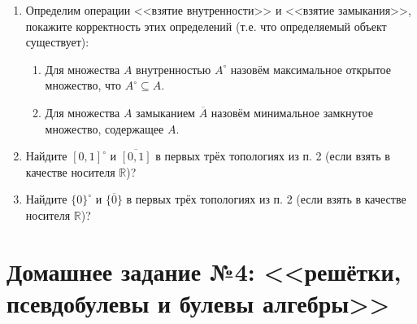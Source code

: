 \documentclass[10pt,a4paper,oneside]{article}
\begin{document}
\begin{enumerate}
\item Определим операции <<взятие внутренности>> и <<взятие замыкания>>, покажите корректность этих определений
(т.е. что определяемый объект существует):
\begin{enumerate}
\item Для множества $A$ внутренностью $A^\circ$ назовём максимальное открытое множество, 
что $A^\circ \subseteq A$. 
\item Для множества $A$ замыканием $\overline{A}$ назовём минимальное замкнутое множество, содержащее $A$.
\end{enumerate}

\item Найдите $[0,1]^\circ$ и $\overline{[0,1]}$ в первых трёх топологиях из п. 2 
(если взять в качестве носителя $\mathbb{R}$)?
\item Найдите $\{0\}^\circ$ и $\overline{\{0\}}$ в первых трёх топологиях из п. 2 
(если взять в качестве носителя $\mathbb{R}$)?

\end{enumerate}

\section*{Домашнее задание №4: <<решётки, псевдобулевы и булевы алгебры>>}
\end{document}
